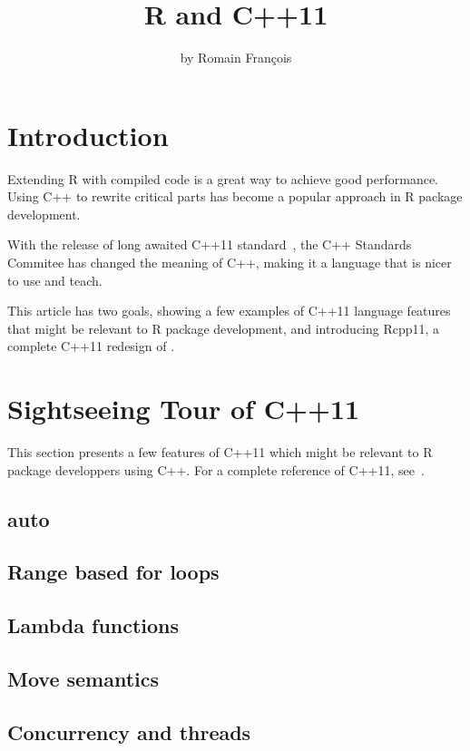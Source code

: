 \title{R and C++11}
\author{by Romain François}

\maketitle

\abstract{}

\section{Introduction}

Extending R with compiled code is a great way to achieve good performance. 
Using C++ to rewrite critical parts has become a popular approach
in R package development. 

With the release of long awaited C++11 standard~\citep{Cpp11}, 
the C++ Standards Commitee has changed the meaning of C++, making it 
a language that is nicer to use and teach. 

This article has two goals, 
showing a few examples of C++11 language features that might be 
relevant to R package development, and introducing
Rcpp11, a complete C++11 redesign of . 

\section{Sightseeing Tour of C++11}

This section presents a few features of C++11 which might be 
relevant to R package developpers using C++. For a complete 
reference of C++11, see~\citep{Stroustrup2013}. 

\subsection{auto}
\subsection{Range based for loops}
\subsection{Lambda functions}
\subsection{Move semantics}
\subsection{Concurrency and threads}

